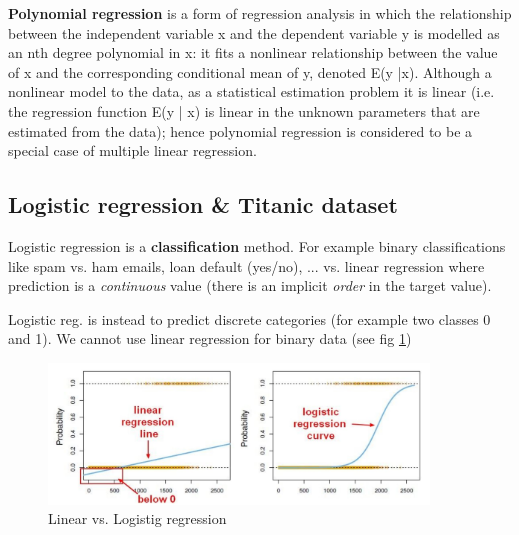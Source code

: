 \documentclass[12pt]{article}
\begin{document}
\textbf{Polynomial regression} is a form of regression analysis in which the relationship between the independent variable x and the dependent variable y is modelled as an nth degree polynomial in x: it  fits a nonlinear relationship between the value of x and the corresponding conditional mean of y, denoted E(y |x). Although a nonlinear model to the data, as a statistical estimation problem it is linear (i.e. the regression function E(y | x) is linear in the unknown parameters that are estimated from the data); hence polynomial regression is considered to be a special case of multiple linear regression.

\subsection{Logistic regression \& Titanic dataset}
Logistic regression is a \textbf{classification} method. For example binary classifications like spam vs. ham emails, loan default (yes/no), ... 
vs. linear regression where prediction is a \textit{continuous} value (there is an implicit \textit{order} in the target value). 

Logistic reg. is instead to predict discrete categories (for example two classes 0 and 1). We cannot use linear regression for binary data (see fig \ref{lin_log_regr})


\begin{figure}[htbp] 
	\centering
	\includegraphics[width=0.9\textwidth]{pics/logistic_regression}
	\caption{Linear vs. Logistig regression} 
	\label{lin_log_regr}
\end{figure}
\end{document}

